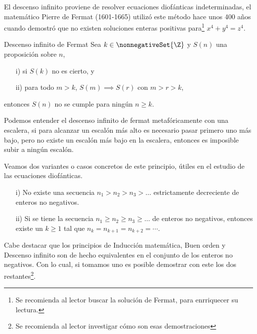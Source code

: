 El descenso infinito proviene de resolver ecuaciones diofánticas indeterminadas, el matemático Pierre de Fermat
(1601-1665) utilizó este método hace unos 400 años cuando demostró que no existen soluciones enteras positivas
para\footnote{Se recomienda al lector buscar la solución de Fermat, para enrriquecer su lectura.} $x^4 + y^4 = z^4$.

\begin{principle.box}{Descenso infinito de Fermat}{}
    Sea $k \in \nonnegativeSet{\Z}$ y $S(n)$ una proposición sobre $n$,
    \begin{enumerate}
        \item[i)] si $S(k)$ no es cierto, y
        \item[ii)] para todo $m > k$, $S(m) \implies S(r)$ con $m > r > k$,
    \end{enumerate}
    entonces $S(n)$ no se cumple para ningún $n\geq k$.
\end{principle.box}
Podemos entender el descenso infinito de fermat metafóricamente con una escalera, si para alcanzar un escalón más alto es necesario
pasar primero uno más bajo, pero no existe un escalón más bajo en la escalera, entonces es imposible subir a ningún escalón.

Veamos dos variantes o casos concretos de este principio, útiles en el estudio de las ecuaciones diofánticas.
\begin{enumerate}
    \item[i)] No existe una secuencia $n_1 > n_2 > n_3 > \ldots$ estrictamente decreciente de enteros no negativos.
    \item[ii)] Si se tiene la secuencia $n_1\geq n_2 \geq n_3 \geq \ldots$ de enteros no negativos, entonces existe un $k \geq 1$ tal que $n_k = n_{k+1} = n_{k + 2} = \cdots$.
\end{enumerate}

Cabe destacar que los principios de Inducción matemática, Buen orden y Descenso infinito son de hecho equivalentes en
el conjunto de los enteros no negativos.
Con lo cual, si tomamos uno es posible demostrar con este los dos restantes\footnote{Se recomienda al lector investigar cómo son esas demostraciones}.

